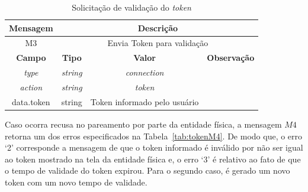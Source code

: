 \begin{table}[htb]
	\centering
	\caption{Solicitação de validação do \textit{token}}
	\begin{tabular}{|c|ccc|}
		\hline
		\rowcolor[HTML]{C0C0C0} 
		\textbf{Mensagem} & \multicolumn{3}{c|}{\cellcolor[HTML]{C0C0C0}\textbf{Descrição}} \\ \hline
		M3 & \multicolumn{3}{c|}{Envia Token para validação} \\ \hline
		\rowcolor[HTML]{C0C0C0} 
		\textbf{Campo} & \multicolumn{1}{c|}{\cellcolor[HTML]{C0C0C0}\textbf{Tipo}} & \multicolumn{1}{c|}{\cellcolor[HTML]{C0C0C0}\textbf{Valor}} & \textbf{Observação} \\ \hline
		\textit{type} & \multicolumn{1}{c|}{\textit{string}} & \multicolumn{1}{c|}{\textit{connection}} &  \\ \hline
		\textit{action} & \multicolumn{1}{c|}{\textit{string}} & \multicolumn{1}{c|}{\textit{token}} &  \\ \hline
		data.token & \multicolumn{1}{c|}{string} & \multicolumn{1}{c|}{Token informado pelo usuário} &  \\ \hline
	\end{tabular}
	\label{tab:tokenM3}	
\end{table}

Caso ocorra recusa no pareamento por parte da entidade física, a mensagem $M4$ retorna um dos erros especificados na Tabela~\ref{tab:tokenM4}. De modo que, o erro `2' corresponde a mensagem de que o token informado é inválido por não ser igual ao token mostrado na tela da entidade física e, o erro `3' é relativo ao fato de que o tempo de validade do token expirou. Para o segundo caso, é gerado um novo token com um novo tempo de validade.

